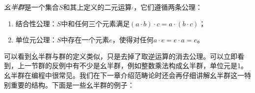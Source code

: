 \documentclass{article}
\begin{document}
\begin{definition}
{\em 幺半群}是一个集合$S$和其上定义的二元运算$\cdot$，它们遵循两条公理：
\begin{enumerate}
\item 结合性公理：$S$中和任何三个元素满足$(a \cdot b) \cdot c = a \cdot (b \cdot c)$；
\item 单位元公理：$S$中存在一个元素$e$，使得对任何$a \cdot e = e \cdot a = e$。
\end{enumerate}
\end{definition}

可以看到幺半群与群的定义类似，只是去掉了取逆运算的消去公理。可以立即看到，上一节群的反例中有不少是幺半群，例如整数乘法构成幺半群，单位元是1。幺半群在编程中很常见。我们在下一章介绍范畴论时还会再仔细讲解幺半群这一特别重要的结构。下面是一些幺半群的例子：
\end{document}
